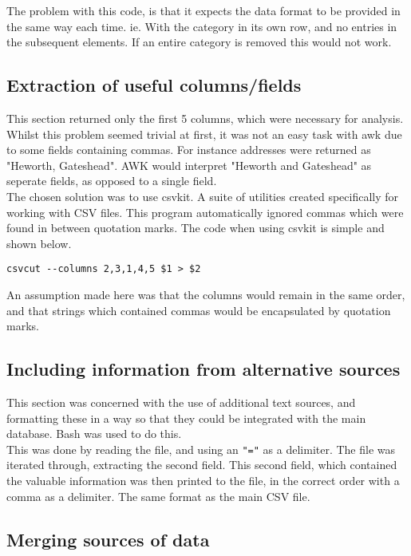 \documentclass{article}
\begin{document}
The problem with this code, is that it expects the data format to be provided in the same way each time. ie. With the category in its own row, and no entries in the subsequent elements. If an entire category is removed this would not work.

\subsection*{Extraction of useful columns/fields}

This section returned only the first 5 columns, which were necessary for analysis. Whilst this problem seemed trivial at first, it was not an easy task with awk due to some fields containing commas. For instance addresses were returned as "Heworth, Gateshead". AWK would interpret "Heworth and Gateshead" as seperate fields, as opposed to a single field. \\

The chosen solution was to use csvkit. A suite of utilities created specifically for working with CSV files. This program automatically ignored commas which were found in between quotation marks. The code when using csvkit is simple and shown below.

\begin{lstlisting}
csvcut --columns 2,3,1,4,5 $1 > $2
\end{lstlisting}

An assumption made here was that the columns would remain in the same order, and that strings which contained commas would be encapsulated by quotation marks.


\subsection*{Including information from alternative sources}

This section was concerned with the use of additional text sources, and formatting these in a way so that they could be integrated with the main database. Bash was used to do this. \\

This was done by reading the file, and using an \lstinline|"="| as a delimiter. The file was iterated through, extracting the second field. This second field, which contained the valuable information was then printed to the file, in the correct order with a comma as a delimiter. The same format as the main CSV file.

\subsection*{Merging sources of data}
\end{document}
